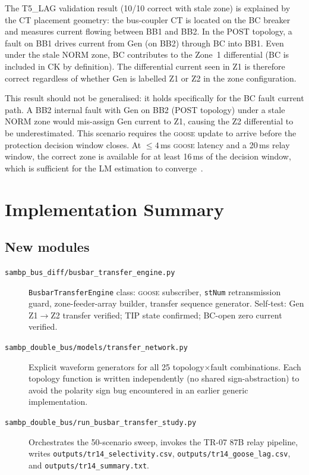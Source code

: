 \documentclass[11pt,a4paper]{article}
\newcommand{\goose}{\textsc{goose}}
\begin{document}
The T5\_LAG validation result (10/10 correct with stale zone) is explained
by the CT placement geometry: the bus-coupler CT is located on the BC
breaker and measures current flowing between BB1 and BB2.  In the POST
topology, a fault on BB1 drives current from Gen (on BB2) through BC into
BB1.  Even under the stale NORM zone, BC contributes to the Zone~1
differential (BC is included in CK by definition).  The differential
current seen in Z1 is therefore correct regardless of whether Gen is
labelled Z1 or Z2 in the zone configuration.

This result should not be generalised: it holds specifically for the BC
fault current path.  A BB2 internal fault with Gen on BB2 (POST topology)
under a stale NORM zone would mis-assign Gen current to Z1, causing the Z2
differential to be underestimated.  This scenario requires the \goose{}
update to arrive before the protection decision window closes.  At
$\leq 4$\,ms \goose{} latency and a 20\,ms relay window, the correct zone
is available for at least 16\,ms of the decision window, which is
sufficient for the LM estimation to converge~\cite{Anderson1999}.

\section{Implementation Summary}
\label{sec:implementation}

\subsection{New modules}

\begin{description}
  \item[\texttt{sambp\_bus\_diff/busbar\_transfer\_engine.py}]
        \texttt{BusbarTransferEngine} class: \goose{} subscriber,
        \texttt{stNum} retransmission guard, zone-feeder-array builder,
        transfer sequence generator.  Self-test: Gen Z1$\to$Z2 transfer
        verified; TIP state confirmed; BC-open zero current verified.

  \item[\texttt{sambp\_double\_bus/models/transfer\_network.py}]
        Explicit waveform generators for all 25 topology$\times$fault
        combinations.  Each topology function is written independently
        (no shared sign-abstraction) to avoid the polarity sign bug
        encountered in an earlier generic implementation.

  \item[\texttt{sambp\_double\_bus/run\_busbar\_transfer\_study.py}]
        Orchestrates the 50-scenario sweep, invokes the TR-07 87B relay
        pipeline, writes \texttt{outputs/tr14\_selectivity.csv},
        \texttt{outputs/tr14\_goose\_lag.csv}, and
        \texttt{outputs/tr14\_summary.txt}.
\end{description}
\end{document}

